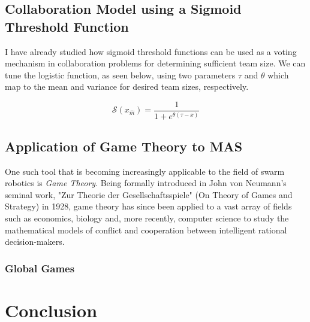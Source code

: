 \documentclass[11pt, onecolumn, compsoc, letterpaper]{article}
\newcommand{\sig}{\mathcal{S}}
\newcommand{\xm}{x_{\hat{m}}}
\begin{document}
\subsection{Collaboration Model using a Sigmoid Threshold Function}
I have already studied how sigmoid threshold functions can be used as a voting mechanism in collaboration problems for determining sufficient team size. We can tune the logistic function, as seen below, using two parameters $\tau$ and $\theta$ which map to the mean and variance for desired team sizes, respectively.

\begin{equation}
	\sig(\xm) = \frac{1}{1 + e^{\theta(\tau - x)}}
\end{equation}


\subsection{Application of Game Theory to MAS}
One such tool that is becoming increasingly applicable to the field of swarm robotics is \emph{Game Theory}. Being formally introduced in John von Neumann's seminal work, "Zur Theorie der Gesellschaftsspiele" (On Theory of Games and Strategy) in 1928, game theory has since been applied to a vast array of fields such as economics, biology and, more recently, computer science to study the mathematical models of conflict and cooperation between intelligent rational decision-makers.

\subsubsection{Global Games}



\section{Conclusion}

%


\end{document}
